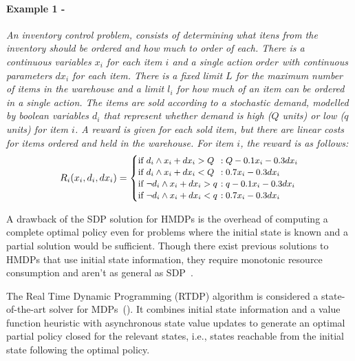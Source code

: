 \paragraph{\bf Example 1 - \Invent ~\cite{scarf2002} \label{ex1}}
\textit{An inventory control problem, consists of determining what itens from the inventory should be ordered and how much to order of each. There is a continuous variables $x_i$ for each item $i$ and a single action $order$ with continuous parameters $dx_i$ for each item. There is a fixed limit $L$ for the maximum number of items in the warehouse and a limit $l_i$ for how much of an item can be ordered in a single action. The items are sold according to a stochastic demand, modelled by boolean variables $d_i$ that represent whether demand is high ($Q$ units) or low ($q$ units) for item $i$. A reward is given for each sold item, but there are linear costs for items ordered and held in the warehouse. For item $i$, the reward is as follows:
\begin{align*}
\small
R_{i} (x_i, d_i, dx_i)=
\begin{cases}
  \text{if }  d_i \wedge x_i + dx_i > Q &\hspace{-2mm} : Q - 0.1x_i - 0.3dx_i\\ 
  \text{if }  d_i \wedge x_i + dx_i < Q &\hspace{-2mm} : 0.7x_i - 0.3dx_i\\ 
  \text{if }  \neg d_i \wedge x_i + dx_i > q &\hspace{-2mm} : q - 0.1x_i - 0.3dx_i\\ 
  \text{if }  \neg d_i \wedge x_i+dx_i < q &\hspace{-2mm} : 0.7x_i - 0.3dx_i\\ 
\end{cases}
\end{align*}
}

A drawback of the SDP solution for HMDPs is the overhead of computing a complete optimal policy even for problems where the initial state is known and a partial solution would be sufficient. Though there exist previous solutions to HMDPs that use initial state information, they require monotonic resource consumption and aren't as general as SDP~\cite{meuleau09HAO}.

The Real Time Dynamic Programming (RTDP) algorithm is considered a state-of-the-art solver for MDPs~(\cite{Barto95RTDP,kolobov12GOURMAND}). It combines initial state information and a value function heuristic with asynchronous state value updates to generate an optimal partial policy closed for the relevant states, i.e., states reachable from the initial state following the optimal policy.

